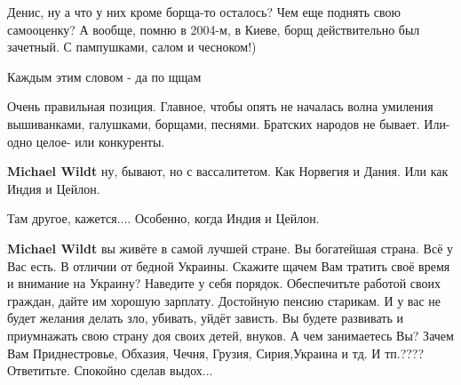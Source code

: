 \begin{itemize}
Денис, ну а что у них кроме борща-то осталось? Чем еще поднять свою самооценку?
А вообще, помню в 2004-м, в Киеве, борщ действительно был зачетный. С
пампушками, салом и чесноком!)

 
Каждым этим словом - да по щщам

 

Очень правильная позиция. Главное, чтобы опять не началась волна умиления
вышиванками, галушками, борщами, песнями. Братских народов не бывает. Или-одно
целое- или конкуренты.

\begin{itemize}
 
\textbf{Michael Wildt} ну, бывают, но с вассалитетом. Как Норвегия и Дания. Или как Индия и Цейлон.

 
Там другое, кажется.... Особенно, когда Индия и Цейлон.

 
\textbf{Michael Wildt} вы живёте в самой лучшей стране. Вы богатейшая страна. Всё у Вас есть. В отличии от бедной Украины. Скажите щачем Вам тратить своё время и внимание на Украину? Наведите у себя порядок. Обеспечитьте работой своих граждан, дайте им хорошую зарплату. Достойную пенсию старикам. И у вас не будет желания делать зло, убивать, уйдёт зависть. Вы будете развивать и приумнажать свою страну доя своих детей, внуков. А чем занимаетесь Вы? Зачем Вам Приднестровье, Обхазия, Чечня, Грузия, Сирия,Украина и тд. И тп.???? Ответитьте. Спокойно сделав выдох...


\end{itemize}
\end{itemize}
